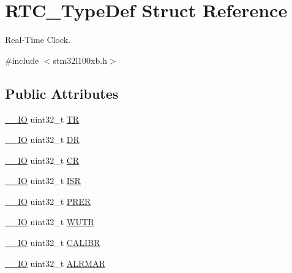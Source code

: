 \hypertarget{struct_r_t_c___type_def}{\section{R\-T\-C\-\_\-\-Type\-Def Struct Reference}
\label{struct_r_t_c___type_def}
}


Real-\/\-Time Clock.  




{\ttfamily \#include $<$stm32l100xb.\-h$>$}

\subsection*{Public Attributes}
\begin{DoxyCompactItemize}
\item 
\hyperlink{core__sc300_8h_aec43007d9998a0a0e01faede4133d6be}{\-\_\-\-\_\-\-I\-O} uint32\-\_\-t \hyperlink{struct_r_t_c___type_def_a2e8783857f8644a4eb80ebc51e1cba42}{T\-R}
\item 
\hyperlink{core__sc300_8h_aec43007d9998a0a0e01faede4133d6be}{\-\_\-\-\_\-\-I\-O} uint32\-\_\-t \hyperlink{struct_r_t_c___type_def_a8750eae683cb3d382476dc7cdcd92b96}{D\-R}
\item 
\hyperlink{core__sc300_8h_aec43007d9998a0a0e01faede4133d6be}{\-\_\-\-\_\-\-I\-O} uint32\-\_\-t \hyperlink{struct_r_t_c___type_def_a731d9209ce40dce6ea61fcc6f818c892}{C\-R}
\item 
\hyperlink{core__sc300_8h_aec43007d9998a0a0e01faede4133d6be}{\-\_\-\-\_\-\-I\-O} uint32\-\_\-t \hyperlink{struct_r_t_c___type_def_a5a7b104d80b48b5708b50cdc487d6a78}{I\-S\-R}
\item 
\hyperlink{core__sc300_8h_aec43007d9998a0a0e01faede4133d6be}{\-\_\-\-\_\-\-I\-O} uint32\-\_\-t \hyperlink{struct_r_t_c___type_def_a5f43a11e0873212f598e41db5f2dcf6a}{P\-R\-E\-R}
\item 
\hyperlink{core__sc300_8h_aec43007d9998a0a0e01faede4133d6be}{\-\_\-\-\_\-\-I\-O} uint32\-\_\-t \hyperlink{struct_r_t_c___type_def_ad93017bb0a778a2aad9cd71211fc770a}{W\-U\-T\-R}
\item 
\hyperlink{core__sc300_8h_aec43007d9998a0a0e01faede4133d6be}{\-\_\-\-\_\-\-I\-O} uint32\-\_\-t \hyperlink{struct_r_t_c___type_def_a2403d29b2bfffb734ebef6642c0d2724}{C\-A\-L\-I\-B\-R}
\item 
\hyperlink{core__sc300_8h_aec43007d9998a0a0e01faede4133d6be}{\-\_\-\-\_\-\-I\-O} uint32\-\_\-t \hyperlink{struct_r_t_c___type_def_ad7e54d5c5a4b9fd1e26aca85b1e36c7f}{A\-L\-R\-M\-A\-R}

\end{DoxyCompactItemize}
